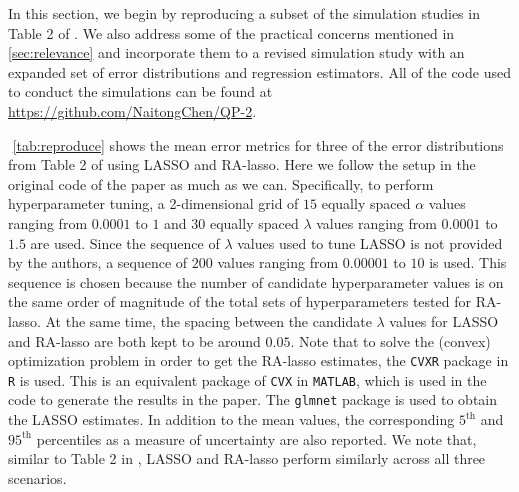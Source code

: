 In this section, we begin by reproducing a subset of the simulation studies in Table 2 of \citet{fan2017estimation}. We also address some of the practical concerns mentioned in \cref{sec:relevance} and incorporate them to a revised simulation study with an expanded set of error distributions and regression estimators. All of the code used to conduct the simulations can be found at \url{https://github.com/NaitongChen/QP-2}.

$ $\newline
\cref{tab:reproduce} shows the mean error metrics for three of the error distributions from Table 2 of \citet{fan2017estimation} using LASSO and RA-lasso. Here we follow the setup in the original code of the paper as much as we can. Specifically, to perform hyperparameter tuning, a 2-dimensional grid of $15$ equally spaced $\alpha$ values ranging from $0.0001$ to $1$ and $30$ equally spaced $\lambda$ values ranging from $0.0001$ to $1.5$ are used. Since the sequence of $\lambda$ values used to tune LASSO is not provided by the authors, a sequence of $200$ values ranging from $0.00001$ to $10$ is used. This sequence is chosen because the number of candidate hyperparameter values is on the same order of magnitude of the total sets of hyperparameters tested for RA-lasso. At the same time, the spacing between the candidate $\lambda$ values for LASSO and RA-lasso are both kept to be around $0.05$. Note that to solve the (convex) optimization problem in order to get the RA-lasso estimates, the \texttt{CVXR} package in \texttt{R} is used. This is an equivalent package of \texttt{CVX} in \texttt{MATLAB}, which is used in the code to generate the results in the paper. The \texttt{glmnet} package is used to obtain the LASSO estimates. In addition to the mean values, the corresponding $5^\text{th}$ and $95^\text{th}$ percentiles as a measure of uncertainty are also reported. We note that, similar to Table 2 in \citet{fan2017estimation}, LASSO and RA-lasso perform similarly across all three scenarios.

